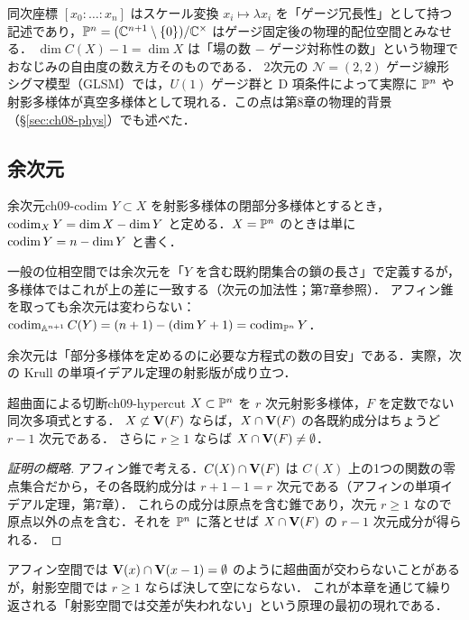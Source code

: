 \begin{physbox}[ゲージ自由度の除去]
同次座標 $[x_0:\dots:x_n]$ はスケール変換 $x_i\mapsto\lambda x_i$ を「ゲージ冗長性」として持つ記述であり，$\mathbb{P}^n=(\mathbb{C}^{n+1}\setminus\{0\})/\mathbb{C}^\times$ はゲージ固定後の物理的配位空間とみなせる．
$\dim C(X)-1=\dim X$ は「場の数 $-$ ゲージ対称性の数」という物理でおなじみの自由度の数え方そのものである．
2次元の $\mathcal N=(2,2)$ ゲージ線形シグマ模型（GLSM）では，$U(1)$ ゲージ群と D 項条件によって実際に $\mathbb{P}^n$ や射影多様体が真空多様体として現れる．この点は第8章の物理的背景（\S\ref{sec:ch08-phys}）でも述べた．
\end{physbox}

\subsection{余次元}

\begin{mydef}{余次元}{ch09-codim}
$Y\subset X$ を射影多様体の閉部分多様体とするとき，$\operatorname{codim}_X Y=\dim X-\dim Y$ と定める．$X=\mathbb{P}^n$ のときは単に $\operatorname{codim} Y=n-\dim Y$ と書く．
\end{mydef}

一般の位相空間では余次元を「$Y$ を含む既約閉集合の鎖の長さ」で定義するが，多様体ではこれが上の差に一致する（次元の加法性；第7章参照）．
アフィン錐を取っても余次元は変わらない：$\operatorname{codim}_{\mathbb{A}^{n+1}}C(Y)=(n+1)-(\dim Y+1)=\operatorname{codim}_{\mathbb{P}^n}Y$．

余次元は「部分多様体を定めるのに必要な方程式の数の目安」である．実際，次の Krull の単項イデアル定理の射影版が成り立つ．

\begin{myprop}{超曲面による切断}{ch09-hypercut}
$X\subset\mathbb{P}^n$ を $r$ 次元射影多様体，$F$ を定数でない同次多項式とする．
$X\not\subset\mathbf{V}(F)$ ならば，$X\cap\mathbf{V}(F)$ の各既約成分はちょうど $r-1$ 次元である．
さらに $r\ge1$ ならば $X\cap\mathbf{V}(F)\neq\emptyset$．
\end{myprop}

\begin{proof}[証明の概略]
アフィン錐で考える．$C(X)\cap\mathbf{V}(F)$ は $C(X)$ 上の1つの関数の零点集合だから，その各既約成分は $r+1-1=r$ 次元である（アフィンの単項イデアル定理，第7章）．
これらの成分は原点を含む錐であり，次元 $r\ge1$ なので原点以外の点を含む．それを $\mathbb{P}^n$ に落とせば $X\cap\mathbf{V}(F)$ の $r-1$ 次元成分が得られる．
\end{proof}

アフィン空間では $\mathbf{V}(x)\cap\mathbf{V}(x-1)=\emptyset$ のように超曲面が交わらないことがあるが，射影空間では $r\ge1$ ならば決して空にならない．
これが本章を通じて繰り返される「射影空間では交差が失われない」という原理の最初の現れである．

